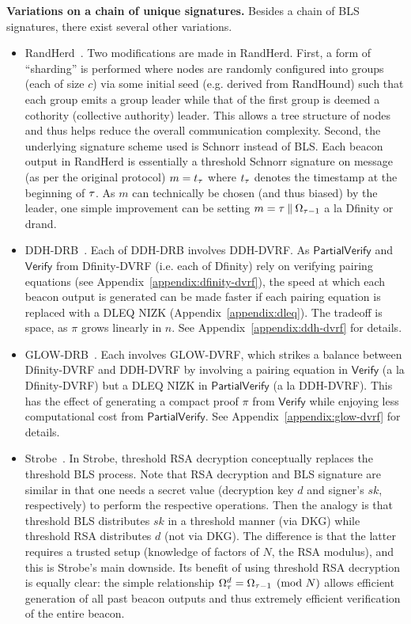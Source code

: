 \noindent\textbf{Variations on a chain of unique signatures.} Besides a chain of BLS signatures, there exist several other variations.
\begin{itemize}
\item RandHerd~\cite{syta2017scalable}. Two modifications are made in RandHerd. First, a form of ``sharding'' is performed where nodes are randomly configured into groups (each of size $c$) via some initial seed (e.g. derived from RandHound) such that each group emits a group leader while that of the first group is deemed a cothority (collective authority) leader. This allows a tree structure of nodes and thus helps reduce the overall communication complexity. Second, the underlying signature scheme used is Schnorr instead of BLS. Each beacon output in RandHerd is essentially a threshold Schnorr signature on message (as per the original protocol) $m = t_\tau$ where $t_\tau$ denotes the timestamp at the beginning of \epoch $\tau$. As $m$ can technically be chosen (and thus biased) by the leader, one simple improvement can be setting $m = \tau \mathbin\Vert \Omega_{\tau - 1}$ a la Dfinity or drand.
\item DDH-DRB~\cite{galindo2020fully}. Each \epoch of DDH-DRB involves DDH-DVRF. As $\mathsf{PartialVerify}$ and $\mathsf{Verify}$ from Dfinity-DVRF (i.e. each \epoch of Dfinity) rely on verifying pairing equations (see Appendix~\ref{appendix:dfinity-dvrf}), the speed at which each beacon output is generated can be made faster if each pairing equation is replaced with a DLEQ NIZK (Appendix~\ref{appendix:dleq}). The tradeoff is space, as $\pi$ grows linearly in $n$. See Appendix~\ref{appendix:ddh-dvrf} for details.
\item GLOW-DRB~\cite{galindo2020fully}. Each \epoch involves GLOW-DVRF, which strikes a balance between Dfinity-DVRF and DDH-DVRF by involving a pairing equation in $\mathsf{Verify}$ (a la Dfinity-DVRF) but a DLEQ NIZK in $\mathsf{PartialVerify}$ (a la DDH-DVRF). This has the effect of generating a compact proof $\pi$ from $\mathsf{Verify}$ while enjoying less computational cost from $\mathsf{PartialVerify}$. See Appendix~\ref{appendix:glow-dvrf} for details.
\item Strobe~\cite{beaver2021strobe}. In Strobe, threshold RSA decryption conceptually replaces the threshold BLS process. Note that RSA decryption and BLS signature are similar in that one needs a secret value (decryption key $d$ and signer's $sk$, respectively) to perform the respective operations. Then the analogy is that threshold BLS distributes $sk$ in a threshold manner (via DKG) while threshold RSA distributes $d$ (not via DKG). The difference is that the latter requires a trusted setup (knowledge of factors of $N$, the RSA modulus), and this is Strobe's main downside. Its benefit of using threshold RSA decryption is equally clear: the simple relationship $\Omega_\tau^d = \Omega_{\tau - 1} \pmod N$ allows efficient generation of all past beacon outputs and thus extremely efficient verification of the entire beacon.
\end{itemize}
